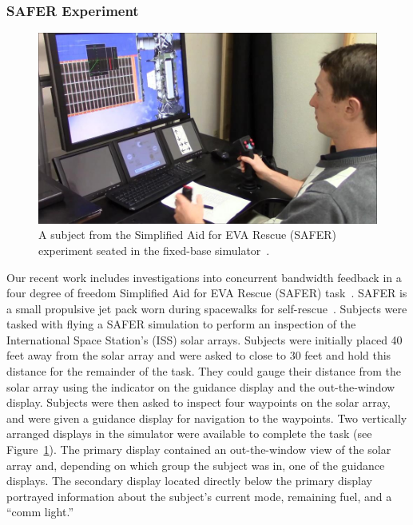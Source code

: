 \subsubsection{SAFER Experiment}
\begin{figure}[b!]
    \begin{center}
        \includegraphics[width=0.8\linewidth]{figures/AR/SAFER_DangerChris.jpg}
        \caption[Simplified Aid for EVA Rescue (SAFER) experiment subject seated in the fixed-base simulator]{A subject from the Simplified Aid for EVA Rescue (SAFER) experiment seated in the fixed-base simulator~\citep{karasinski_real-time_2016}.}
        \label{figure:safersim}
    \end{center}
\end{figure}

Our recent work includes investigations into concurrent bandwidth feedback in a four degree of freedom Simplified Aid for EVA Rescue (SAFER) task~\citep{karasinski_real-time_2016, karasinski_real-time_2017, karasinski_development_2016}.
SAFER is a small propulsive jet pack worn during spacewalks for self-rescue~\citep{Vassigh1998}.
Subjects were tasked with flying a SAFER simulation to perform an inspection of the International Space Station's (ISS) solar arrays.
Subjects were initially placed 40 feet away from the solar array and were asked to close to 30 feet and hold this distance for the remainder of the task.
They could gauge their distance from the solar array using the indicator on the guidance display and the out-the-window display.
Subjects were then asked to inspect four waypoints on the solar array, and were given a guidance display for navigation to the waypoints.
Two vertically arranged displays in the simulator were available to complete the task (see Figure~\ref{figure:safersim}).
The primary display contained an out-the-window view of the solar array and, depending on which group the subject was in, one of the guidance displays.
The secondary display located directly below the primary display portrayed information about the subject's current mode, remaining fuel, and a ``comm light.''

